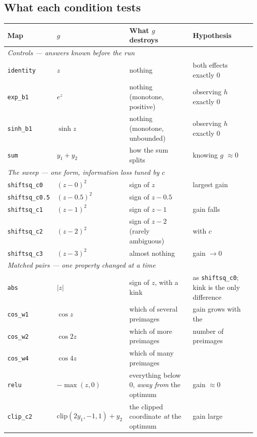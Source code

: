 \documentclass[11pt]{article}
\begin{document}
\subsection{What each condition tests}

\begin{center}
\small
\begin{tabular}{llp{3.6cm}p{3.3cm}}
\toprule
Map & $g$ & What $g$ destroys & Hypothesis \\
\midrule
\multicolumn{4}{l}{\emph{Controls --- answers known before the run}}\\
\texttt{identity}   & $z$ & nothing & both effects exactly $0$ \\
\texttt{exp\_b1}    & $e^{z}$ & nothing (monotone, positive) & observing $h$ exactly $0$ \\
\texttt{sinh\_b1}   & $\sinh z$ & nothing (monotone, unbounded) & observing $h$ exactly $0$ \\
\texttt{sum}        & $y_1+y_2$ & how the sum splits & knowing $g$ $\approx0$ \\
\midrule
\multicolumn{4}{l}{\emph{The sweep --- one form, information loss tuned by $c$}}\\
\texttt{shiftsq\_c0}   & $(z-0)^2$   & sign of $z$   & largest gain \\
\texttt{shiftsq\_c0.5} & $(z-0.5)^2$ & sign of $z-0.5$ & \\
\texttt{shiftsq\_c1}   & $(z-1)^2$   & sign of $z-1$ & gain falls \\
\texttt{shiftsq\_c2}   & $(z-2)^2$   & sign of $z-2$ (rarely ambiguous) & with $c$ \\
\texttt{shiftsq\_c3}   & $(z-3)^2$   & almost nothing & gain $\to0$ \\
\midrule
\multicolumn{4}{l}{\emph{Matched pairs --- one property changed at a time}}\\
\texttt{abs}     & $|z|$ & sign of $z$, with a kink & as \texttt{shiftsq\_c0}; kink is the only difference \\
\texttt{cos\_w1} & $\cos z$    & which of several preimages & gain grows with the \\
\texttt{cos\_w2} & $\cos 2z$   & which of more preimages & number of preimages \\
\texttt{cos\_w4} & $\cos 4z$   & which of many preimages & \\
\texttt{relu}    & $-\max(z,0)$ & everything below $0$, \emph{away from} the optimum & gain $\approx0$ \\
\texttt{clip\_c2}& $\mathrm{clip}(2y_1,-1,1)+y_2$ & the clipped coordinate \emph{at} the optimum & gain large \\

\end{tabular}
\end{center}
\end{document}
